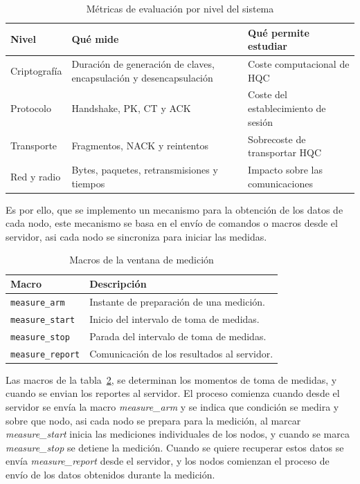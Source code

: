 \begin{table}[htbp]
    \centering
    \caption{Métricas de evaluación por nivel del sistema}
    \label{tab:metricas_hqc}
    \begin{tabularx}{\textwidth}{l X X}
        \toprule
        \textbf{Nivel} & \textbf{Qué mide} & \textbf{Qué permite estudiar} \\
        \midrule
        Criptografía & Duración de generación de claves, encapsulación y desencapsulación & Coste computacional de HQC \\
        \addlinespace
        Protocolo & Handshake, PK, CT y ACK & Coste del establecimiento de sesión \\
        \addlinespace
        Transporte & Fragmentos, NACK y reintentos & Sobrecoste de transportar HQC \\
        \addlinespace
        Red y radio & Bytes, paquetes, retransmisiones y tiempos & Impacto sobre las comunicaciones \\
        \bottomrule
    \end{tabularx}
\end{table}

Es por ello, que se implemento un mecanismo para la obtención de los datos de cada nodo, este mecanismo se basa en el envío de 
comandos o macros desde el servidor, asi cada nodo se sincroniza para iniciar las medidas.  

\begin{table}[htbp]
    \centering
    \caption{Macros de la ventana de medición}
    \label{tab:window_med}
    \begin{tabularx}{\textwidth}{l X}
        \toprule
        \textbf{Macro} & \textbf{Descripción} \\
        \midrule
        \texttt{measure\_arm}    & Instante de preparación de una medición. \\
        \addlinespace
        \texttt{measure\_start}  & Inicio del intervalo de toma de medidas. \\
        \addlinespace
        \texttt{measure\_stop}   & Parada del intervalo de toma de medidas. \\
        \addlinespace
        \texttt{measure\_report} & Comunicación de los resultados al servidor. \\
        \bottomrule
    \end{tabularx}
\end{table}

Las macros de la tabla~\ref{tab:window_med}, se determinan los momentos de toma de medidas, y cuando se envian los reportes al servidor. El proceso 
comienza cuando desde el servidor se envía la macro \textit{measure\_arm} y se indica que condición se medira y sobre que nodo,
asi cada nodo se prepara para la medición, al marcar \textit{measure\_start} inicia las mediciones individuales de los nodos, 
y cuando se marca \textit{measure\_stop} se detiene la medición. Cuando se quiere recuperar estos datos se envía \textit{measure\_report}
desde el servidor, y los nodos comienzan el proceso de envío de los datos obtenidos durante la medición. 

